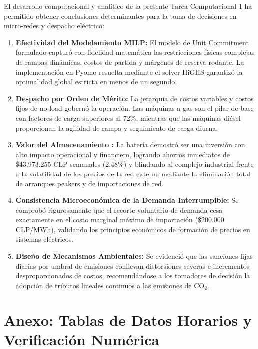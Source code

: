 \documentclass[10pt,letterpaper]{article}
\begin{document}
El desarrollo computacional y analítico de la presente Tarea Computacional 1 ha permitido obtener conclusiones determinantes para la toma de decisiones en micro-redes y despacho eléctrico:
\begin{enumerate}
    \item \textbf{Efectividad del Modelamiento MILP:} El modelo de Unit Commitment formulado capturó con fidelidad matemática las restricciones físicas complejas de rampas dinámicas, costos de partida y márgenes de reserva rodante. La implementación en Pyomo resuelta mediante el solver HiGHS garantizó la optimalidad global estricta en menos de un segundo.
    \item \textbf{Despacho por Orden de Mérito:} La jerarquía de costos variables y costos fijos de no-load gobernó la operación. Las máquinas a gas son el pilar de base con factores de carga superiores al 72\%, mientras que las máquinas diésel proporcionan la agilidad de rampa y seguimiento de carga diurna.
    \item \textbf{Valor del Almacenamiento :} La batería demostró ser una inversión con alto impacto operacional y financiero, logrando ahorros inmediatos de \$43.973.255 CLP semanales (2,48\%) y blindando al complejo industrial frente a la volatilidad de los precios de la red externa mediante la eliminación total de arranques peakers y de importaciones de red.
    \item \textbf{Consistencia Microeconómica de la Demanda Interrumpible:} Se comprobó rigurosamente que el recorte voluntario de demanda cesa exactamente en el costo marginal máximo de importación (\$200.000 CLP/MWh), validando los principios económicos de formación de precios en sistemas eléctricos.
    \item \textbf{Diseño de Mecanismos Ambientales:} Se evidenció que las sanciones fijas diarias por umbral de emisiones conllevan distorsiones severas e incrementos desproporcionados de costos, recomendándose a los tomadores de decisión la adopción de tributos lineales continuos a las emisiones de $\text{CO}_2$.
\end{enumerate}


\newpage
\appendix
\section{Anexo: Tablas de Datos Horarios y Verificación Numérica}
\label{sec:anexo}
\end{document}
